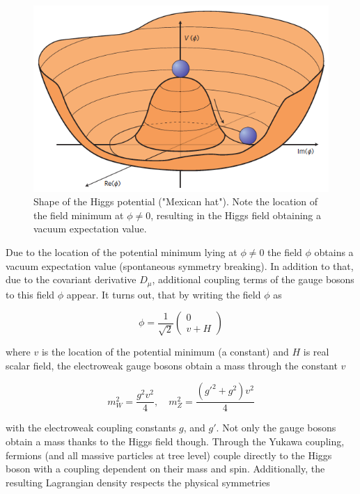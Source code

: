 \begin{figure}[h!]
	\centering
	\includegraphics[width=0.8\linewidth]{figures/theory/higgspotential}
	\caption{Shape of the Higgs potential ("Mexican hat"). Note the location of the field minimum at $\phi \neq 0$, resulting in the Higgs field obtaining a vacuum expectation value. \cite{Ellis:2012465}}
	\label{fig:mexicanhat}
\end{figure}

Due to the location of the potential minimum lying at $\phi \neq 0$ the field $\phi$ obtains a vacuum expectation value (spontaneous symmetry breaking). In addition to that, due to the covariant derivative $D_\mu$, additional coupling terms of the gauge bosons to this field $\phi$ appear. It turns out, that by writing the field $\phi$ as

\begin{equation*}
	\phi = \frac{1}{\sqrt{2}}\left(\begin{matrix}
		0 \\
		v + H
	\end{matrix}
	\right)
\end{equation*}

where $v$ is the location of the potential minimum (a constant) and $H$ is real scalar field, the electroweak gauge bosons  obtain a mass through the constant $v$

\begin{equation*}
	m^2_W = \frac{g^2 v^2}{4}, \quad m^2_Z = \frac{(g'^2 + g^2)v^2}{4}
\end{equation*}

with the electroweak coupling constants $g$, and $g'$. Not only the gauge bosons obtain a mass thanks to the Higgs field though. Through the Yukawa coupling, fermions (and all massive particles at tree level) couple directly to the Higgs boson with a coupling dependent on their mass and spin. Additionally, the resulting Lagrangian density respects the physical symmetries


